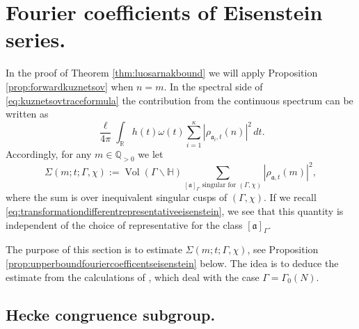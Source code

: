 \documentclass{article}
\theoremstyle{named}
\newcommand{\Q}{\mathbb{Q}}
\newcommand{\Hyp}{\mathbb{H}}
\newcommand{\R}{\mathbb{R}}
\renewcommand{\a}{\mathfrak{a}}
\DeclareMathOperator{\vol}{Vol}
\begin{document}
\section{Fourier coefficients of Eisenstein series.}\label{sec:fouriercoefficientseisensteinseries}
In the proof of Theorem \ref{thm:luosarnakbound} we will apply Proposition \ref{prop:forwardkuznetsov} when $n = m$. In the spectral side of \eqref{eq:kuznetsovtraceformula} the contribution from the continuous spectrum can be written as
\begin{equation*}
    \frac{\ell}{4\pi}\int_{\R} h(t) \omega(t)\sum_{i = 1}^\kappa\left|\rho_{\a_i, t}(n)\right|^2 \, dt. 
\end{equation*}
Accordingly, for any $m \in \Q_{> 0}$ we let 
\begin{equation}\label{eq:defiofl2normfouriercoefficientseisenstein}
    \Sigma(m; t; \Gamma, \chi) := \vol(\Gamma\backslash \Hyp)\sum_{[\a]_\Gamma \text{ singular for }(\Gamma, \chi)}\left|\rho_{\a, t}(m)\right|^2,
\end{equation} 
where the sum is over inequivalent singular cusps of $(\Gamma, \chi)$. If we recall \eqref{eq:transformationdifferentrepresentativeeisenstein}, we see that this quantity is independent of the choice of representative for the class $[\a]_\Gamma$. 

The purpose of this section is to estimate $\Sigma(m; t; \Gamma, \chi)$, see Proposition \ref{prop:upperboundfouriercoefficentseisenstein} below. The idea is to deduce the estimate from the calculations of \cite{youngeisensteinseries}, which deal with the case $\Gamma = \Gamma_0(N)$.

\subsection{Hecke congruence subgroup.}
\end{document}
